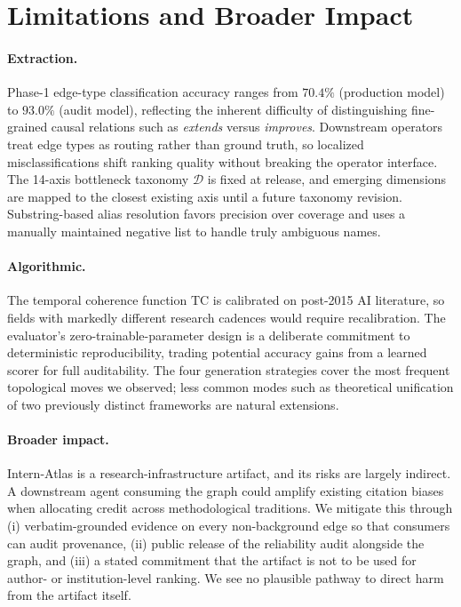 \documentclass{opendatalab}
\begin{document}
\section{Limitations and Broader Impact}
\label{app:limitations}

\paragraph{Extraction.}
Phase-1 edge-type classification accuracy ranges from $70.4\%$ (production model) to $93.0\%$ (audit model), reflecting the inherent difficulty of distinguishing fine-grained causal relations such as \emph{extends} versus \emph{improves}. Downstream operators treat edge types as routing rather than ground truth, so localized misclassifications shift ranking quality without breaking the operator interface. The 14-axis bottleneck taxonomy $\mathcal{D}$ is fixed at release, and emerging dimensions are mapped to the closest existing axis until a future taxonomy revision. Substring-based alias resolution favors precision over coverage and uses a manually maintained negative list to handle truly ambiguous names.

\paragraph{Algorithmic.}
The temporal coherence function $\mathrm{TC}$ is calibrated on post-2015 AI literature, so fields with markedly different research cadences would require recalibration. The evaluator's zero-trainable-parameter design is a deliberate commitment to deterministic reproducibility, trading potential accuracy gains from a learned scorer for full auditability. The four generation strategies cover the most frequent topological moves we observed; less common modes such as theoretical unification of two previously distinct frameworks are natural extensions.

\paragraph{Broader impact.}
Intern-Atlas is a research-infrastructure artifact, and its risks are largely indirect. A downstream agent consuming the graph could amplify existing citation biases when allocating credit across methodological traditions. We mitigate this through (i) verbatim-grounded evidence on every non-background edge so that consumers can audit provenance, (ii) public release of the reliability audit alongside the graph, and (iii) a stated commitment that the artifact is not to be used for author- or institution-level ranking. We see no plausible pathway to direct harm from the artifact itself.
\end{document}
